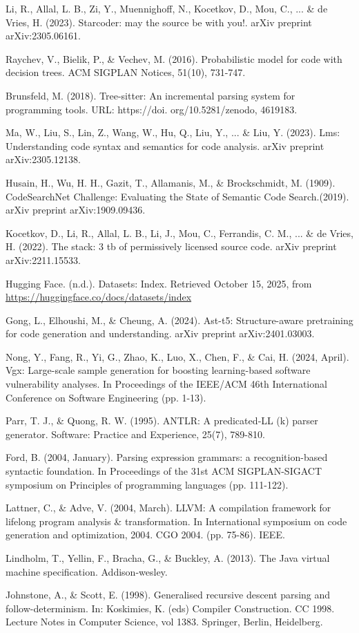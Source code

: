 \documentclass{article}
\begin{document}
\begin{thebibliography}{00}
Li, R., Allal, L. B., Zi, Y., Muennighoff, N., Kocetkov, D., Mou, C., ... \& de Vries, H. (2023). Starcoder: may the source be with you!. arXiv preprint arXiv:2305.06161.

Raychev, V., Bielik, P., \& Vechev, M. (2016). Probabilistic model for code with decision trees. ACM SIGPLAN Notices, 51(10), 731-747.

Brunsfeld, M. (2018). Tree-sitter: An incremental parsing system for programming tools. URL: https://doi. org/10.5281/zenodo, 4619183.

Ma, W., Liu, S., Lin, Z., Wang, W., Hu, Q., Liu, Y., ... \& Liu, Y. (2023). Lms: Understanding code syntax and semantics for code analysis. arXiv preprint arXiv:2305.12138.

Husain, H., Wu, H. H., Gazit, T., Allamanis, M., \& Brockschmidt, M. (1909). CodeSearchNet Challenge: Evaluating the State of Semantic Code Search.(2019). arXiv preprint arXiv:1909.09436.

Kocetkov, D., Li, R., Allal, L. B., Li, J., Mou, C., Ferrandis, C. M., ... \& de Vries, H. (2022). The stack: 3 tb of permissively licensed source code. arXiv preprint arXiv:2211.15533.

Hugging Face. (n.d.). Datasets: Index. Retrieved October 15, 2025, from \url{https://huggingface.co/docs/datasets/index}

Gong, L., Elhoushi, M., \& Cheung, A. (2024). Ast-t5: Structure-aware pretraining for code generation and understanding. arXiv preprint arXiv:2401.03003.

Nong, Y., Fang, R., Yi, G., Zhao, K., Luo, X., Chen, F., \& Cai, H. (2024, April). Vgx: Large-scale sample generation for boosting learning-based software vulnerability analyses. In Proceedings of the IEEE/ACM 46th International Conference on Software Engineering (pp. 1-13).

Parr, T. J., \& Quong, R. W. (1995). ANTLR: A predicated‐LL (k) parser generator. Software: Practice and Experience, 25(7), 789-810.

Ford, B. (2004, January). Parsing expression grammars: a recognition-based syntactic foundation. In Proceedings of the 31st ACM SIGPLAN-SIGACT symposium on Principles of programming languages (pp. 111-122).

Lattner, C., \& Adve, V. (2004, March). LLVM: A compilation framework for lifelong program analysis \& transformation. In International symposium on code generation and optimization, 2004. CGO 2004. (pp. 75-86). IEEE.

Lindholm, T., Yellin, F., Bracha, G., \& Buckley, A. (2013). The Java virtual machine specification. Addison-wesley.

Johnstone, A., \& Scott, E. (1998). Generalised recursive descent parsing and follow-determinism. In: Koskimies, K. (eds) Compiler Construction. CC 1998. Lecture Notes in Computer Science, vol 1383. Springer, Berlin, Heidelberg.

\end{thebibliography}
\end{document}
